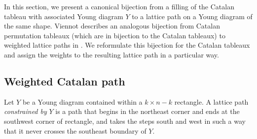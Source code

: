 \documentclass[11pt]{article}
\numberwithin{equation}{section}
\theoremstyle{plain}
\theoremstyle{definition}
\newtheorem{defn}{Definition}[section]
\theoremstyle{remark}
\begin{document}
In this section, we present a canonical bijection from a filling of the Catalan tableau with associated Young diagram $Y$ to a lattice path on a Young diagram of the same shape. Viennot describes an analogous bijection from Catalan permutation tableaux (which are in bijection to the Catalan tableaux) to weighted lattice paths in \cite{viennot}. We reformulate this bijection for the Catalan tableaux and assign the weights to the resulting lattice path in a particular way.






\subsection{Weighted Catalan path}
Let $Y$ be a Young diagram contained within a $k \times n-k$ rectangle. A lattice path \emph{constrained by} $Y$ is a path that begins in the northeast corner and ends at the southwest corner of rectangle, and takes the steps south and west in such a way that it never crosses the southeast boundary of $Y$. 
\end{document}
